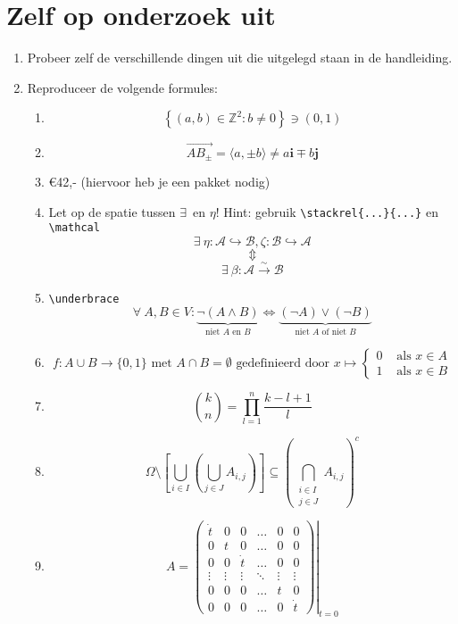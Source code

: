 \documentclass{article}
\begin{document}
\section{Zelf op onderzoek uit}
\begin{enumerate}
	\item Probeer zelf de verschillende dingen uit die uitgelegd staan in de handleiding.
	\item Reproduceer de volgende formules:
	\begin{enumerate}
		\item \[  \left\{(a,b) \in \mathbb{Z}^2 : b \neq 0\right\} \ni (0,1) \]
		\item \[\overrightarrow{AB_{\pm}} = \langle a, \pm b \rangle \neq a\mathbf{i} \mp b\mathbf{j}\]
		\item \euro 42,- (hiervoor heb je een pakket nodig)
		\item Let op de spatie tussen \textquotesingle\(\exists\)\textquotesingle \ en \textquotesingle\(\eta\)\textquotesingle! Hint: gebruik \verb|\stackrel{...}{...}| en \verb.\mathcal.
			\[\exists \ \eta :\mathcal{A} \hookrightarrow \mathcal{B}, \zeta : \mathcal{B} \hookrightarrow \mathcal{A}\]
			\[\Updownarrow\]
			\[\exists \ \beta : \mathcal{A} \stackrel{\sim}{\longrightarrow} \mathcal{B}\]
		\item \verb+\underbrace+
			\[\forall \ A, B \in V :  \underbrace{\neg(A \wedge B)}_{\text{niet } A \text{ en } B} \Longleftrightarrow \underbrace{(\neg A) \vee (\neg B)}_{\text{niet } A \text{ of niet } B}\]
		\item 			\[f : A \cup B \to \{0,1\} \text{ met } A \cap B = \emptyset \text{ gedefinieerd door } x \mapsto \begin{cases} 0 & \text{ als } x \in A\\1 & \text{ als } x \in B \end{cases}\]
		\item 
			\[\binom{k}{n} = \prod_{l = 1}^n\frac{k-l+1}{l}\]
		\item	
			\[\Omega \setminus \left[\bigcup_{i \in I}\left(\bigcup_{j \in J} A_{i,j} \right)\right] \subseteq \left(\bigcap_{\begin{smallmatrix} i \in I \\ j \in J \end{smallmatrix}} A_{i,j}\right)^c\]
		\item
			\[A = \left.\left(
			\begin{array}{cccccc}
				\dot{t} 	& 0 		& 0		& \ldots 	& 0 		& 0\\
				0 		& t 		& 0		& \ldots 	& 0 		& 0\\
				0 		& 0 		& \dot{t} & \ldots 	& 0 		& 0\\
				\vdots 	& \vdots 	& \vdots 	& \ddots 	& \vdots 	& \vdots \\
				0 		& 0 		& 0 		& \ldots 	& t 		& 0\\
				0 		& 0 		& 0 		& \ldots 	& 0 		& \dot{t}
			\end{array}\right)\right|_{t = 0}\]
	\end{enumerate}
\end{enumerate}
\end{document}
